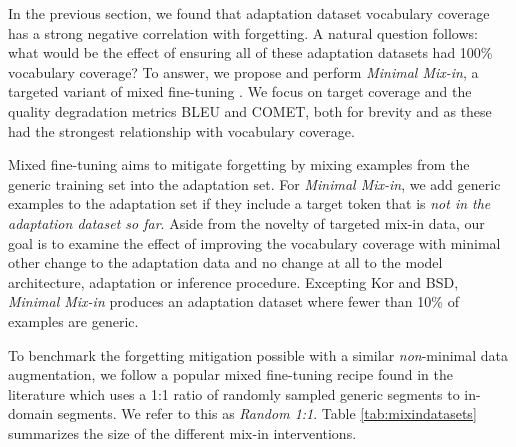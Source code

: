 \documentclass[11pt]{article}
\begin{document}
In the previous section, we found that adaptation dataset vocabulary coverage has a strong negative correlation with forgetting. A natural question follows: what would be the effect of ensuring all of these adaptation datasets had 100\% vocabulary coverage?  To answer, we propose and perform \emph{Minimal Mix-in}, a targeted variant of mixed fine-tuning \cite{chu-etal-2017-empirical}. We focus on target coverage and the quality degradation metrics BLEU and COMET, both for brevity and as these had the strongest relationship with vocabulary coverage.

Mixed fine-tuning aims to mitigate forgetting by mixing examples from the generic training set into the adaptation set. For \emph{Minimal Mix-in}, we add generic examples to the adaptation set if they include a target token that is \emph{not in the adaptation dataset so far}. Aside from the novelty of targeted mix-in data, our goal is to examine the effect of improving the vocabulary coverage with minimal other change to the adaptation data and no change at all to the model architecture, adaptation or inference procedure. Excepting Kor and BSD, \emph{Minimal Mix-in} produces an adaptation dataset where fewer than 10\% of examples are generic. 


To benchmark the  forgetting mitigation possible with a similar \emph{non}-minimal data augmentation,  we follow a popular mixed fine-tuning recipe found in the literature \cite{haque-etal-2020-terminology,hasler-etal-2021-improving}  which uses a 1:1 ratio of randomly sampled generic segments to in-domain  segments. We refer to this as \emph{Random 1:1}. Table \ref{tab:mixindatasets} summarizes the size of the different mix-in interventions.








\end{document}
